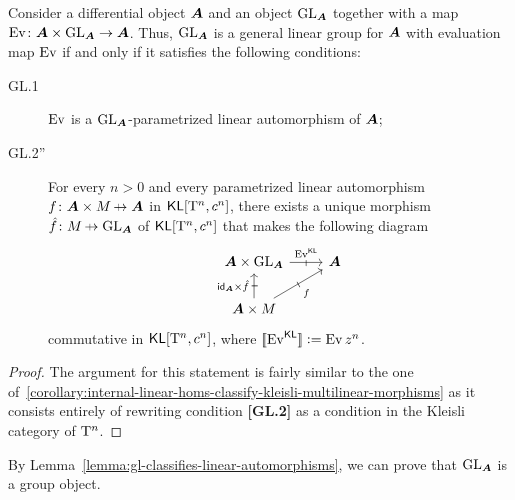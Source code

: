 \begin{lemma}
\label{lemma:general-linear-groups-kleisli}
Consider a differential object ${\bm{A}}$ and an object $\operatorname{GL}_{\bm{A}}$ together with a map $\operatorname{Ev}\colon{\bm{A}}\times\operatorname{GL}_{\bm{A}}\to{\bm{A}}$. Thus, $\operatorname{GL}_{\bm{A}}$ is a general linear group for ${\bm{A}}$ with evaluation map $\operatorname{Ev}$ if and only if it satisfies the following conditions:
\begin{description}
\item[GL.1] $\operatorname{Ev}$ is a $\operatorname{GL}_{\bm{A}}$-parametrized linear automorphism of ${\bm{A}}$;

\item[GL.2''] For every $n>0$ and every parametrized linear automorphism $f\colon\A\times M\nto\A$ in $\mathsf{KL}[\mathrm{T}^n,c^n]$, there exists a unique morphism $\hat f\colon M\nto\GL_\A$ of $\mathsf{KL}[\mathrm{T}^n,c^n]$ that makes the following diagram
\begin{equation*}
\begin{tikzcd}
{\A\times\GL_\A} & \A \\
{\A\times M}
\arrow["{\Ev^\KL}"{inner sep=.8ex}, "\shortmid"{marking}, from=1-1, to=1-2]
\arrow["{\id_\A\times\hat f}"{inner sep=.8ex}, "\shortmid"{marking}, from=2-1, to=1-1]
\arrow["f"'{inner sep=.8ex}, "\shortmid"{marking}, from=2-1, to=1-2]
\end{tikzcd}
\end{equation*}
commutative in $\mathsf{KL}[\mathrm{T}^n,c^n]$, where $[\![\operatorname{Ev}^{\mathsf{KL}}]\!]\mathrel{\mathop:}=\operatorname{Ev} z^n$.
\end{description}
\end{lemma}
\begin{proof}
The argument for this statement is fairly similar to the one of~\ref{corollary:internal-linear-homs-classify-kleisli-multilinear-morphisms} as it consists entirely of rewriting condition \textbf{[GL.2]} as a condition in the Kleisli category of $\mathrm{T}^n$.
\end{proof}

By Lemma~\ref{lemma:gl-classifies-linear-automorphisms}, we can prove that $\operatorname{GL}_{\bm{A}}$ is a group object.

